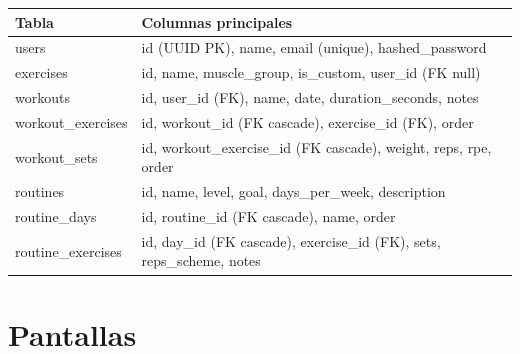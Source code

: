 \documentclass[12pt, a4paper]{article}
\begin{document}
\begin{longtable}{>{\ttfamily}p{4.5cm} p{9.5cm}}
  \toprule
  Tabla & Columnas principales \\
  \midrule
  \endhead
  users               & id (UUID PK), name, email (unique), hashed\_password \\
  exercises           & id, name, muscle\_group, is\_custom, user\_id (FK null) \\
  workouts            & id, user\_id (FK), name, date, duration\_seconds, notes \\
  workout\_exercises  & id, workout\_id (FK cascade), exercise\_id (FK), order \\
  workout\_sets       & id, workout\_exercise\_id (FK cascade), weight, reps, rpe, order \\
  routines            & id, name, level, goal, days\_per\_week, description \\
  routine\_days       & id, routine\_id (FK cascade), name, order \\
  routine\_exercises  & id, day\_id (FK cascade), exercise\_id (FK), sets, reps\_scheme, notes \\
  \bottomrule
\end{longtable}

\section{Pantallas}
\end{document}
